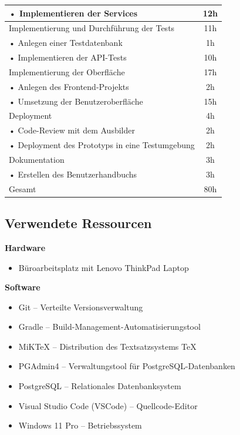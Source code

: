 \documentclass[a4paper,12pt]{article}
\begin{document}
\begin{tabular}{|p{\textwidth}|c|}
    \hspace{0.5cm}• Implementieren der Services & 12h \\
    \hline
    \rowcolor{gray}Implementierung und Durchführung der Tests & 11h \\
    \hline
    \hspace{0.5cm}• Anlegen einer Testdatenbank & 1h \\
    \hline
    \hspace{0.5cm}• Implementieren der API-Tests & 10h \\
    \hline
    \rowcolor{gray}Implementierung der Oberfläche & 17h \\
    \hline
    \hspace{0.5cm}• Anlegen des Frontend-Projekts & 2h \\
    \hline
    \hspace{0.5cm}• Umsetzung der Benutzeroberfläche & 15h \\
    \hline
    \rowcolor{gray}Deployment & 4h \\
    \hline
    \hspace{0.5cm}• Code-Review mit dem Ausbilder & 2h \\
    \hline
    \hspace{0.5cm}• Deployment des Prototyps in eine Testumgebung & 2h \\
    \hline
    \rowcolor{gray}Dokumentation & 3h \\
    \hline
    \hspace{0.5cm}• Erstellen des Benutzerhandbuchs & 3h \\
    \hline
    \rowcolor{gray}Gesamt & 80h \\
    \hline
\end{tabular}

\clearpage
\subsection{Verwendete Ressourcen}
\label{sec:ressourcen}

\noindent\textbf{Hardware}
\begin{itemize}
\item Büroarbeitsplatz mit Lenovo ThinkPad Laptop
\end{itemize}

\noindent\textbf{Software}
\begin{itemize}
\item Git – Verteilte Versionsverwaltung
\item Gradle – Build-Management-Automatisierungstool
\item MiKTeX – Distribution des Textsatzsystems \TeX
\item PGAdmin4 – Verwaltungstool für PostgreSQL-Datenbanken
\item PostgreSQL – Relationales Datenbanksystem
\item Visual Studio Code (VSCode) – Quellcode-Editor
\item Windows 11 Pro – Betriebssystem
\end{itemize}
\end{document}
